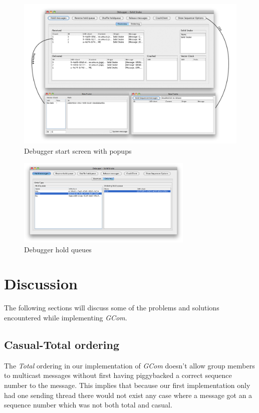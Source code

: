 \documentclass[titlepage, twocolumn, a4paper, 10pt]{article}
\begin{document}
\begin{figure}[!thb]
  \centerline{\includegraphics[width=150mm]{images/Debuggerstart.png}}
  \caption{Debugger start screen with popups}
  \label{fig:images/Debuggerstart}
\end{figure}

\begin{figure}[!thb]
  \centering
  \includegraphics[width=3.3in]{images/Holdqueues.png}
  \caption{Debugger hold queues}
  \label{fig:images/holdqueues}
\end{figure}


\section{Discussion}\label{sec:discussion}
The following sections will discuss some of the problems and solutions
encountered while implementing \textit{GCom}.

\subsection{Casual-Total ordering}\label{sec:disc-casual-total}
The \textit{Total} ordering in our implementation of \textit{GCom}
doesn't allow group members to multicast messages without first having
piggybacked a correct sequence number to the message. This implies
that because our first implementation only had one sending thread
there would not exist any case where a message got an a sequence
number which was not both total and casual.
\end{document}
